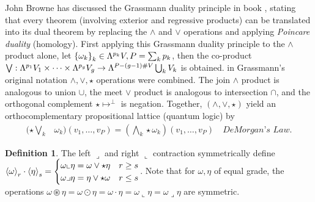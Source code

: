 \documentclass[]{article}
\theoremstyle{definition}
\newtheorem{definition}{Definition}
\theoremstyle{remark}
\begin{document}
John Browne has discussed the Grassmann duality principle in book \cite{browne}, stating that every theorem (involving exterior and regressive products) can be translated into its dual theorem by replacing the $\wedge$ and $\vee$ operations and applying \textit{Poincare duality} (homology).
First applying this Grassmann duality principle to the $\wedge$ product alone, let $\left\{ \omega_k \right\}_k\in\Lambda^{p_k}V, P=\sum_kp_k$, then the co-product
$\bigvee :\Lambda^{p_1}V_1\times\dots\times\Lambda^{p_g}V_g \rightarrow \Lambda^{P-(g-1)\#V}\bigcup_k V_k$ is obtained.
in Grassmann's original notation $\wedge,\vee,\star$ operations were combined.
The join $\wedge$ product is analogous to union $\cup$, the meet $\vee$ product is analogous to intersection $\cap$, and the orthogonal complement $\star\mapsto^\perp$ is negation.
Together, $(\wedge,\vee,\star)$ yield an orthocomplementary propositional lattice (quantum logic) by
\begin{align*}
	(\star\bigvee_k &\omega_k)(v_1,\dots,v_P) = (\bigwedge_k\star\omega_k)(v_1,\dots,v_P) \quad \textit{DeMorgan's Law}.
\end{align*}
\begin{definition}
	The left $\lrcorner$ and right $\llcorner$ contraction symmetrically define
	$ \left\langle \omega \right\rangle_r\cdot\left\langle \eta \right\rangle_s = \begin{cases} \omega\llcorner\eta=\omega\vee\star\eta & r\geq s \\ \omega\lrcorner\eta=\eta\vee\star\omega & r\leq s \end{cases} $.
	Note that for $\omega,\eta$ of equal grade, the operations $\omega\circledast\eta = \omega\odot\eta = \omega\cdot\eta = \omega\llcorner\eta = \omega\lrcorner\eta$ are symmetric.
\end{definition}
\end{document}
